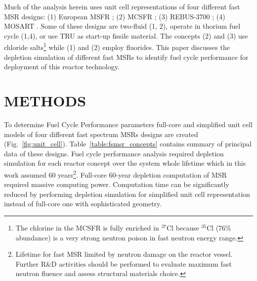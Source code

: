 \documentclass{anstrans}
\begin{document}
Much of the analysis herein uses unit cell representations of four different fast \gls{MSR} designs: 
(1) European \gls{MSFR} \cite{noauthor_final_2015}; (2) \gls{MCSFR} \cite{simmons_assessment_1974}; (3) REBUS-3700 \cite{mourogov_potentialities_2006}; (4) \gls{MOSART} \cite{ignatiev_progress_2007}. Some of these designs are two-fluid (1, 2), operate in thorium fuel cycle (1,4), or use \gls{TRU} as start-up fissile material. The concepts (2) and (3) use chloride salts\footnote{The chlorine in the \gls{MCSFR} is fully enriched in $^{37}$Cl because $^{35}$Cl (76\% abundance) is a very strong neutron poison in fast neutron energy range.} while (1) and (2) employ fluorides. This paper discusses the depletion simulation of different fast \glspl{MSR} to identify fuel cycle performance for deployment of this reactor technology.

\section{METHODS} 
\label{sec:methods}
To determine Fuel Cycle Performance parameters full-core and simplified unit cell models of four different fast spectrum \glspl{MSR} designs are created (Fig.~\ref{fig:unit_cell}).  Table~\ref{table:fsmsr_concepts} contains summary of principal data of these designs. Fuel cycle performance analysis required depletion simulation for each reactor concept over the system whole lifetime which in this work assumed 60 years\footnote{Lifetime for fast \gls{MSR} limited by neutron damage on the reactor vessel. Further R\&D activities should be performed to evaluate maximum fast neutron fluence and assess structural materials choice.}. Full-core 60-year depletion computation of \gls{MSR} required massive computing power. Computation time can be significantly reduced by performing depletion simulation for simplified unit cell representation instead of full-core one with sophisticated geometry.
\end{document}
